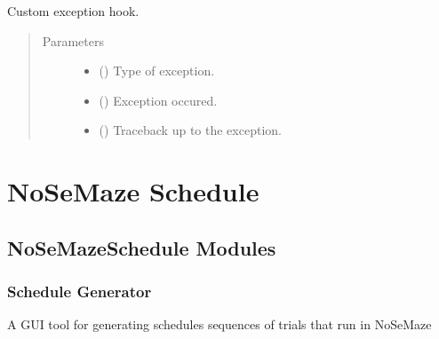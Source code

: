 \documentclass[letterpaper,10pt,english]{sphinxmanual}
\begin{document}
\begin{fulllineitems}
\label{\detokenize{NoSeMazeControl/main:main.my_exception_hook}}
\pysigstartsignatures
{}
\pysigstopsignatures
\sphinxAtStartPar
Custom exception hook.
\begin{quote}\begin{description}
\item[{Parameters}] \leavevmode\begin{itemize}
\item {} 
\sphinxAtStartPar
{} () \textendash{} Type of exception.

\item {} 
\sphinxAtStartPar
{} () \textendash{} Exception occured.

\item {} 
\sphinxAtStartPar
{} () \textendash{} Traceback up to the exception.

\end{itemize}

\end{description}\end{quote}

\end{fulllineitems}


\sphinxstepscope


\chapter{NoSeMaze Schedule}
\label{\detokenize{NoSeMazeSchedule:nosemaze-schedule}}\label{\detokenize{NoSeMazeSchedule::doc}}
\sphinxstepscope


\section{NoSeMazeSchedule Modules}
\label{\detokenize{NoSeMazeSchedule/modules:nosemazeschedule-modules}}\label{\detokenize{NoSeMazeSchedule/modules::doc}}

\subsection{Schedule Generator}
\label{\detokenize{NoSeMazeSchedule/modules:schedule-generator}}
\sphinxAtStartPar
A GUI tool for generating schedules \sphinxhyphen{} sequences of trials that run in NoSeMaze
\end{document}
